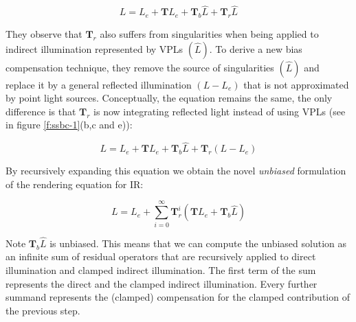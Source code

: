 \begin{equation*}
	L=L_e+\mathbf{T}L_e+\mathbf{T}_b\hat{L}+\mathbf{T}_r\hat{L}
\end{equation*}

They observe that $\mathbf{T}_r$ also suffers from singularities when being applied to indirect illumination represented by VPLs $(\hat{L})$. To derive a new bias compensation technique, they remove the source of singularities $(\hat{L})$ and replace it by a general reflected illumination $(L-L_e)$ that is not approximated by point light sources. Conceptually, the equation remains the same, the only difference is that $\mathbf{T}_r$ is now integrating reflected light instead of using VPLs (see in figure \ref{f:ssbc-1}(b,c and e)):

\begin{equation*}
	L=L_e+\mathbf{T}L_e+\mathbf{T}_b\hat{L}+\mathbf{T}_r(L-L_e)
\end{equation*}

By recursively expanding this equation we obtain the novel \textit{unbiased} formulation of the rendering equation for IR:

\begin{equation}
	L=L_e+\sum^{\infty}_{i=0}\mathbf{T}^{i}_r(\mathbf{T}L_e+\mathbf{T}_b\hat{L})
\end{equation}

Note $\mathbf{T}_b\hat{L}$ is unbiased. This means that we can compute the unbiased solution as an infinite sum of residual operators that are recursively applied to direct illumination and clamped indirect illumination. The first term of the sum represents the direct and the clamped indirect illumination. Every further summand represents the (clamped) compensation for the clamped contribution of the previous step.

